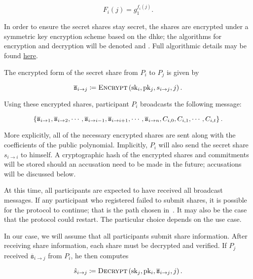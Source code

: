 \begin{equation}
    F_{i}(j) = g_{1}^{f_{i}(j)}.
    \label{eq:dkg_valid_secret}
\end{equation}

In order to ensure the secret shares stay secret,
the shares are encrypted under a \gls{symmetric key encryption} scheme
based on the \gls{dhke};
the algorithms for encryption and decryption will be denoted
\Enc{} and \Dec{}.
Full algorithmic details may be found
\hyperref[sssec:secret_dkg_share_encryption]{here}.

The encrypted form of the secret share from $P_{i}$ to $P_{j}$
is given by

\begin{equation}
    \overline{\texttt{s}}_{i\to j} \coloneqq{}
        \textsc{Encrypt}{}\left( \textrm{sk}{}_{i},\textrm{pk}{}_{j},s_{i\to j}, j \right).
\end{equation}

\noindent
Using these encrypted shares, participant $P_{i}$ broadcasts
the following message:

\begin{equation}
    \left\{ 
    \overline{\texttt{s}}_{i\to 1},
    \overline{\texttt{s}}_{i\to 2},
    \cdots,
    \overline{\texttt{s}}_{i\to i-1},
    \overline{\texttt{s}}_{i\to i+1},
    \cdots,
    \overline{\texttt{s}}_{i\to n},
    C_{i,0}, C_{i,1}, \cdots, C_{i,t} \right\}.
\end{equation}

\noindent
More explicitly, all of the necessary encrypted shares are sent
along with the coefficients of the public polynomial.
Implicitly, $P_{i}$ will also send the secret share $s_{i\to i}$
to himself.
A cryptographic hash of the encrypted shares and commitments
will be stored should an accusation need to be made in the future;
accusations will be discussed below.

At this time, all participants are expected to have received all
broadcast messages.
If any participant who registered failed to submit shares,
it is possible for the protocol to continue;
that is the path chosen in~\cite{ethdkg}.
It may also be the case that the protocol could restart.
The particular choice depends on the use case.

In our case, we will assume that all participants submit share information.
After receiving share information, each share must be decrypted and verified.
If $P_{j}$ received $\overline{\texttt{s}}_{i\to j}$ from $P_{i}$,
he then computes

\begin{equation}
    \hat{s}_{i\to j} \coloneqq{}
        \textsc{Decrypt}{}\left( \textrm{sk}{}_{j}, \textrm{pk}{}_{i}, \overline{\texttt{s}}_{i\to j}, j \right).
\end{equation}

